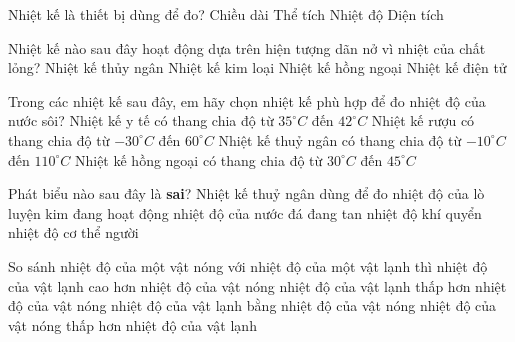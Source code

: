 \begin{ex}
	Nhiệt kế là thiết bị dùng để đo?
	\choice
	{Chiều dài}
	{Thể tích}
	{\True Nhiệt độ}
	{Diện tích}
	\end{ex}



\begin{ex}
	Nhiệt kế nào sau đây hoạt động dựa trên hiện tượng dãn nở vì nhiệt của chất lỏng?
	\choice
	{\True Nhiệt kế thủy ngân}
	{Nhiệt kế kim loại}
	{Nhiệt kế hồng ngoại}
	{Nhiệt kế điện tử}
	\end{ex}

\begin{ex}
	Trong các nhiệt kế sau đây, em hãy chọn nhiệt kế phù hợp để đo nhiệt độ của nước sôi?
	\choice
	{Nhiệt kế y tế có thang chia độ từ $35^\circ C$ đến $42^\circ C$}
	{Nhiệt kế rượu có thang chia độ từ $-30^\circ C$ đến $60^\circ C$}
	{\True Nhiệt kế thuỷ ngân có thang chia độ từ $-10^\circ C$ đến $110^\circ C$}
	{Nhiệt kế hồng ngoại có thang chia độ từ $30^\circ C$ đến $45^\circ C$}
	\end{ex}



\begin{ex}
	Phát biểu nào sau đây là \textbf{sai}? Nhiệt kế thuỷ ngân dùng để đo
	\choice
	{\True nhiệt độ của lò luyện kim đang hoạt động}
	{nhiệt độ của nước đá đang tan}
	{nhiệt độ khí quyển}
	{nhiệt độ cơ thể người}
	\end{ex}
\begin{ex}
	So sánh nhiệt độ của một vật nóng với nhiệt độ của một vật lạnh thì
	\choice
	{nhiệt độ  của vật lạnh cao hơn nhiệt độ của vật nóng}
	{\True nhiệt độ của vật lạnh thấp hơn nhiệt độ của vật nóng}
	{nhiệt độ  của vật lạnh bằng nhiệt độ của vật nóng}
	{nhiệt độ  của vật nóng thấp hơn nhiệt độ của vật lạnh}
	\end{ex}


